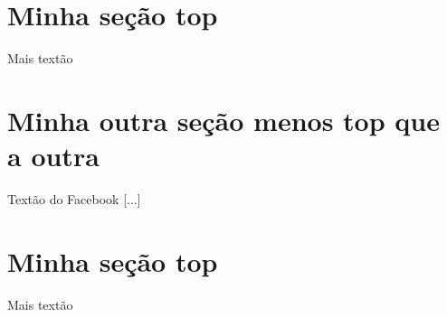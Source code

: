 \documentclass{article}
\begin{document}
\section{Minha seção top}
  Mais textão\\
  \lipsum[2] %



\tableofcontents
\newpage        %

\section{Minha outra seção menos top que a outra}
  Textão do Facebook [...]\\
  \lipsum[1] %

\section{Minha seção top}
  Mais textão\\
  \lipsum[2] %
\end{document}
